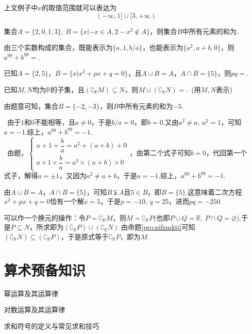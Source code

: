 \documentclass[lang=cn, zihao=5]{elegantbook}
\newcommand{\R}{\mathbb{R}}
\newcommand{\sw}[1]{\boxed{\text{解法 #1}} \ }
\newcommand{\tk}{\uline{\hspace{4em}}}
\begin{document}
上文例子中$x$的取值范围就可以表达为$$(-\infty ,1] \cup [3,+\infty )$$

\begin{problemset}
	\item 集合$A=\{ 2,0,1,3 \},~B = \{ x|-x \in A,2-x^2 \notin A \}$，则集合$B$中所有元素的和为\tk .
	\item 由三个实数构成的集合，既能表示为$\{ a,1,b/a \}$，也能表示为$\{ a^2,a+b,0 \}$，则$a^{99}+b^{99}=$\tk .
	\item 已知$A=\{ 2,5 \}$，$B = \{ x|x^2+px+q=0 \}$，且$A \cup B = A$，$A \cap B = \{ 5 \}$，则$pq=$\tk .
	\item 已知$M,N$均为$\mathbb{R}$的子集，且$(\complement _{\mathbb{R}} M) \subseteq N$，则$M \cup (\complement _{\mathbb{R}} N)=$\tk .~(用$M,N$表示)
\end{problemset}
\begin{psolution}
	\item 由题意可知，集合$B=\{ -2,-3 \}$，则$B$中所有元素的和为$-5$.
	\item \sw{一}由于$1$和$0$不能相等，且$a \neq 0$，于是$b/a=0$，即$b=0$.又由$a^2 \neq a,~a^2=1$，可知$a=-1$.综上，$a^{99}+b^{99}=-1$. \\
	\sw{二}由题，$\begin{cases}
		a+1+\dfrac{b}{a} = a^2+(a+b) + 0 \\ a \times 1 \times \dfrac{b}{a} = a^2 \times (a+b) \times 0
	\end{cases}$，由第二个式子可知$b=0$，代回第一个式子，解得$a= \pm 1$，又因为$a^2 \neq a+b$，于是$a=-1$.综上，$a^{99}+b^{99}=-1$.
	\item 由$A \cup B = A$，$A \cap B = \{ 5 \}$，可知$B \subsetneqq A$且$5 \in B$，即$B=\{ 5 \}$.这意味着二次方程$x^2+px+q=0$恰有一个解$x=5$，于是$p=-10,~q=25$，进而$pq=-250$.
	\item 可以作一个换元的操作：令$P=\complement _{\mathbb{R}} M$，则$M=\complement _{\mathbb{R}} P$(也即$P \cup Q=\R ,~P \cap Q = \varnothing$).于是$P \subseteq N$，所求即为$(\complement _{\mathbb{R}} P) \cup (\complement _{\mathbb{R}} N)$.由命题\ref{pro:nifzmkti}可知$(\complement _{\mathbb{R}} N) \subseteq (\complement _{\mathbb{R}} P)$，于是原式等于$\complement _{\mathbb{R}} P$，即为$M$.
\end{psolution}


\chapter{算术预备知识}

\begin{introduction}
	\item 幂运算及其运算律
	\item 对数运算及其运算律
	\item 求和符号的定义与常见求和技巧
\end{introduction}
\end{document}
